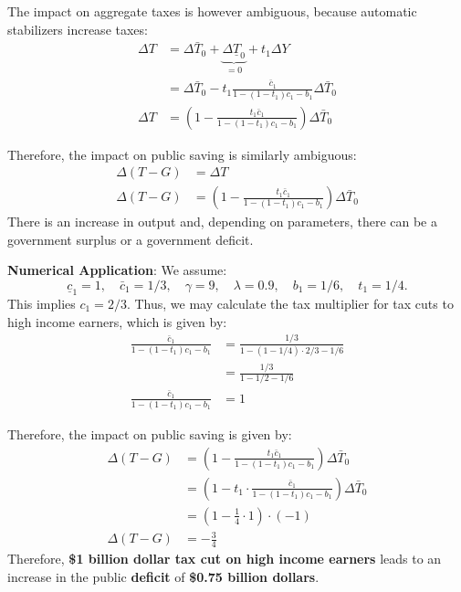 \documentclass[]{book}
\begin{document}
The impact on aggregate taxes is however ambiguous, because automatic
stabilizers increase taxes: \[
\begin{aligned}
\Delta T    &=\Delta\bar{T}_{0}+\underbrace{\Delta\underline{T}_{0}}_{=0}+t_1\Delta Y\\
&=\Delta\bar{T}_{0} - t_1 \frac{\bar{c}_{1}}{1-\left(1-t_{1}\right)c_{1}-b_{1}}\Delta\bar{T}_{0}\\
\Delta T    &=\left(1-\frac{t_1\bar{c}_{1}}{1-\left(1-t_{1}\right)c_{1}-b_{1}}\right)\Delta\bar{T}_{0}
\end{aligned}
\]

Therefore, the impact on public saving is similarly ambiguous: \[
\begin{aligned}
\Delta\left(T-G\right)&=\Delta T \\
\Delta\left(T-G\right)&=\left(1-\frac{t_1\bar{c}_{1}}{1-\left(1-t_{1}\right)c_{1}-b_{1}}\right)\Delta\bar{T}_{0}
\end{aligned}
\] There is an increase in output and, depending on parameters, there
can be a government surplus or a government deficit.

\textbf{Numerical Application}: We assume:
\[\underline{c}_{1}=1, \quad \bar{c}_{1}=1/3,\quad \gamma=9, \quad\lambda=0.9,\quad b_1=1/6, \quad t_1=1/4.\]
This implies \(c_1=2/3.\) Thus, we may calculate the tax multiplier for
tax cuts to high income earners, which is given by: \[
\begin{aligned}
\frac{\bar{c}_{1}}{1-(1-t_1)c_{1}-b_{1}} &= \frac{1/3}{1-(1-1/4) \cdot 2/3-1/6}\\
&= \frac{1/3}{1-1/2-1/6}\\
\frac{\bar{c}_{1}}{1-(1-t_1)c_{1}-b_{1}} &=1
\end{aligned}
\]

Therefore, the impact on public saving is given by: \[
\begin{aligned}
\Delta\left(T-G\right)&=\left(1-\frac{t_1\bar{c}_{1}}{1-\left(1-t_{1}\right)c_{1}-b_{1}}\right)\Delta\bar{T}_{0}\\
&=\left(1-t_1 \cdot \frac{\bar{c}_{1}}{1-\left(1-t_{1}\right)c_{1}-b_{1}}\right)\Delta\bar{T}_{0}\\
&=\left(1-\frac{1}{4} \cdot 1\right) \cdot (-1)\\
\Delta\left(T-G\right)&=-\frac{3}{4}
\end{aligned}
\] Therefore, \textbf{\$1 billion dollar tax cut on high income earners}
leads to an increase in the public \textbf{deficit} of \textbf{\$0.75
billion dollars}.
\end{document}
